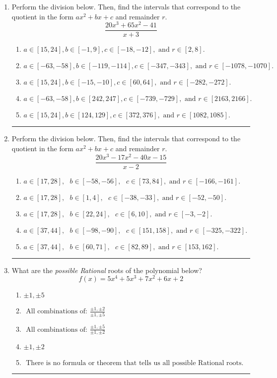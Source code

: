 \documentclass[14pt]{extbook}
\newcommand{\litem}[1]{\item#1\hspace*{-1cm}\rule{\textwidth}{0.4pt}}
\begin{document}
\begin{enumerate}
{\begin{enumerate}[label=\Alph*.]
\end{enumerate} }
\litem{
Perform the division below. Then, find the intervals that correspond to the quotient in the form $ax^2+bx+c$ and remainder $r$.\[ \frac{20x^{3} +65 x^{2} -41}{x + 3} \]\begin{enumerate}[label=\Alph*.]
\item \( a \in [15, 24], b \in [-1, 9], c \in [-18, -12], \text{ and } r \in [2, 8]. \)
\item \( a \in [-63, -58], b \in [-119, -114], c \in [-347, -343], \text{ and } r \in [-1078, -1070]. \)
\item \( a \in [15, 24], b \in [-15, -10], c \in [60, 64], \text{ and } r \in [-282, -272]. \)
\item \( a \in [-63, -58], b \in [242, 247], c \in [-739, -729], \text{ and } r \in [2163, 2166]. \)
\item \( a \in [15, 24], b \in [124, 129], c \in [372, 376], \text{ and } r \in [1082, 1085]. \)

\end{enumerate} }
\litem{
Perform the division below. Then, find the intervals that correspond to the quotient in the form $ax^2+bx+c$ and remainder $r$.\[ \frac{20x^{3} -17 x^{2} -40 x -15}{x -2} \]\begin{enumerate}[label=\Alph*.]
\item \( a \in [17, 28], \text{   } b \in [-58, -56], \text{   } c \in [73, 84], \text{   and   } r \in [-166, -161]. \)
\item \( a \in [17, 28], \text{   } b \in [1, 4], \text{   } c \in [-38, -33], \text{   and   } r \in [-52, -50]. \)
\item \( a \in [17, 28], \text{   } b \in [22, 24], \text{   } c \in [6, 10], \text{   and   } r \in [-3, -2]. \)
\item \( a \in [37, 44], \text{   } b \in [-98, -90], \text{   } c \in [151, 158], \text{   and   } r \in [-325, -322]. \)
\item \( a \in [37, 44], \text{   } b \in [60, 71], \text{   } c \in [82, 89], \text{   and   } r \in [153, 162]. \)

\end{enumerate} }
\litem{
What are the \textit{possible Rational} roots of the polynomial below?\[ f(x) = 5x^{4} +5 x^{3} +7 x^{2} +6 x + 2 \]\begin{enumerate}[label=\Alph*.]
\item \( \pm 1,\pm 5 \)
\item \( \text{ All combinations of: }\frac{\pm 1,\pm 2}{\pm 1,\pm 5} \)
\item \( \text{ All combinations of: }\frac{\pm 1,\pm 5}{\pm 1,\pm 2} \)
\item \( \pm 1,\pm 2 \)
\item \( \text{ There is no formula or theorem that tells us all possible Rational roots.} \)

\end{enumerate} }
\end{enumerate}
\end{document}
